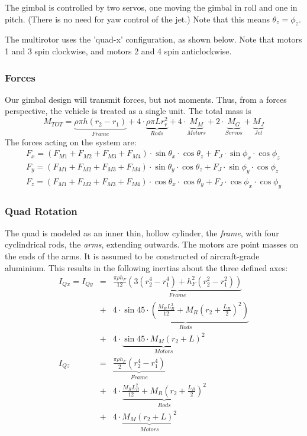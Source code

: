 \documentclass[11pt]{article}
\begin{document}
The gimbal is controlled by two servos, one moving the gimbal in roll and one in pitch. (There is no need for yaw control of the jet.)  Note that this means $\theta_z = \phi_z$.

The multirotor uses the 'quad-x' configuration, as shown below. Note that motors 1 and 3 spin clockwise, and motors 2 and 4 spin anticlockwise.

\subsubsection{Forces}
Our gimbal design will transmit forces, but not moments. Thus, from a forces perspective, the vehicle is treated as a single unit. The total mass is
\begin{equation}
    M_{TOT} = \underbrace{\rho\pi h (r_2-r_1)}_{Frame} + 4\cdot\underbrace{\rho\pi L r_r^2}_{Rods} + 4\cdot\underbrace{M_M}_{Motors} + 2\cdot\underbrace{M_G}_{Servos} + \underbrace{M_J}_{Jet} \label{eqn:total_mass}
\end{equation}
The forces acting on the system are:
\begin{eqnarray}
    F_x = (F_{M1} + F_{M2} + F_{M3} + F_{M4})\cdot\sin{\theta_x}\cdot\cos{\theta_z} +  F_J\cdot\sin{\phi_x}\cdot\cos{\phi_z} \\
    F_y = (F_{M1} + F_{M2} + F_{M3} + F_{M4})\cdot\sin{\theta_y}\cdot\cos{\theta_z} +  F_J\cdot\sin{\phi_y}\cdot\cos{\phi_z} \\
    F_z = (F_{M1} + F_{M2} + F_{M3} + F_{M4})\cdot\cos{\theta_x}\cdot\cos{\theta_y} +  F_J\cdot\cos{\phi_x}\cdot\cos{\phi_y}
\end{eqnarray}

\subsubsection{Quad Rotation}
The quad is modeled as an inner thin, hollow cylinder, the \emph{frame}, with four cyclindrical rods, the \emph{arms}, extending outwards. The motors are point masses on the ends of the arms. It is assumed to be constructed of aircraft-grade aluminium. This results in the following inertias about the three defined axes:
\begin{eqnarray}
    I_{Qx} = I_{Qy} & = & \underbrace{\frac{\pi \rho h_F}{12}(3(r_2^4-r_1^4) + h_F^2(r_2^2-r_1^2))}_{Frame} \nonumber \\ & + & 4 \cdot \underbrace{\sin 45 \cdot (\frac{M_R L_R^2}{12}+M_R(r_2+\frac{L_R}{2})^2)}_{Rods} \nonumber \\ & + & 4 \cdot \underbrace{\sin 45 \cdot M_M(r_2+L)^2}_{Motors} \\
    I_{Qz} & = & \underbrace{\frac{\pi \rho h_F}{2}(r_2^4-r_1^4)}_{Frame} \nonumber \\ & + & 4 \cdot \underbrace{\frac{M_RL_R^2}{12} + M_R(r_2+\frac{L_R}{2})^2}_{Rods} \nonumber \\ & + & 4 \cdot \underbrace{M_M(r_2+L)^2}_{Motors}
\end{eqnarray}
\end{document}
